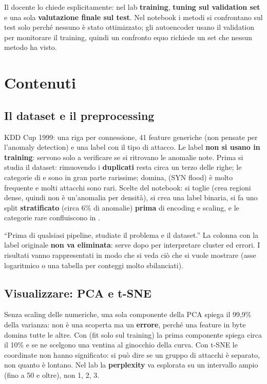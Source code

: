 \begin{esame}
Il docente lo chiede esplicitamente: nel lab \textbf{training}, \textbf{tuning sul validation set} e una
sola \textbf{valutazione finale sul test}. Nel notebook i metodi si confrontano sul test solo perché
nessuno è stato ottimizzato; gli autoencoder usano il validation per monitorare il training, quindi un
confronto equo richiede un set che nessun metodo ha visto.
\end{esame}

\section{Contenuti}

\subsection{Il dataset e il preprocessing}
KDD Cup 1999: una riga per connessione, 41 feature generiche (non pensate per l'anomaly detection) e una
label con il tipo di attacco. Le label \textbf{non si usano in training}: servono solo a verificare se si
ritrovano le anomalie note. Prima si studia il dataset: rimuovendo i \textbf{duplicati} resta circa un
terzo delle righe; le categorie di  e  sono in gran parte rarissime; 
domina,  (SYN flood) è molto frequente e molti attacchi sono rari. Scelte del notebook: si
toglie  (crea regioni dense, quindi non è un'anomalia per densità), si crea una label
binaria, si fa uno split \textbf{stratificato} (circa 6\% di anomalie) \textbf{prima} di encoding e
scaling, e le categorie rare confluiscono in .

\begin{esame}
``Prima di qualsiasi pipeline, studiate il problema e il dataset.'' La colonna con la label originale
\textbf{non va eliminata}: serve dopo per interpretare cluster ed errori. I risultati vanno rappresentati
in modo che si veda ciò che si vuole mostrare (asse logaritmico o una tabella per conteggi molto
sbilanciati).
\end{esame}

\subsection{Visualizzare: PCA e t-SNE}
Senza scaling delle numeriche, una sola componente della PCA spiega il 99,9\% della varianza: non è una
scoperta ma un \textbf{errore}, perché una feature in byte domina tutte le altre. Con
 (fit solo sul training) la prima componente spiega circa il 10\% e se ne scelgono una
ventina al ginocchio della curva. Con t-SNE le coordinate non hanno significato: si può dire se un gruppo
di attacchi è separato, non quanto è lontano. Nel lab la \textbf{perplexity} va esplorata su un intervallo
ampio (fino a 50 e oltre), non 1, 2, 3.

